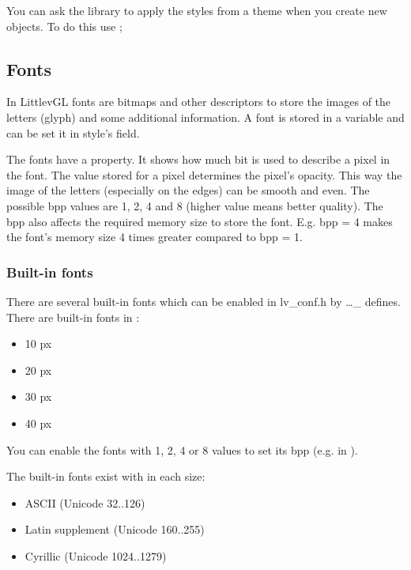 \documentclass[letterpaper,10pt,english]{sphinxmanual}
\begin{document}
You can ask the library to apply the styles from a theme when you create new objects. To do this use ;


\subsection{Fonts}
\label{\detokenize{overview/fonts::doc}}\label{\detokenize{overview/fonts:fonts}}
In LittlevGL fonts are bitmaps and other descriptors to store the images of the letters (glyph) and some additional information. A font is stored in a  variable and can be set it in style’s  field.

The fonts have a  property. It shows how much bit is used to describe a pixel in the font. The value stored for a pixel determines the pixel’s opacity. This way the image of the letters (especially on the edges) can be smooth and even. The possible bpp values are 1, 2, 4 and 8 (higher value means better quality). The bpp also affects the required memory size to store the font. E.g. bpp = 4 makes the font’s memory size 4 times greater compared to bpp = 1.


\subsubsection{Built-in fonts}
\label{\detokenize{overview/fonts:built-in-fonts}}
There are several built-in fonts which can be enabled in lv\_conf.h by …\_ defines. There are built-in fonts in :
\begin{itemize}
\item {} 
10 px

\item {} 
20 px

\item {} 
30 px

\item {} 
40 px

\end{itemize}

You can enable the fonts with 1, 2, 4 or 8 values to set its bpp (e.g.  in ).

The built-in fonts exist with  in each size:
\begin{itemize}
\item {} 
ASCII (Unicode 32..126)

\item {} 
Latin supplement (Unicode 160..255)

\item {} 
Cyrillic (Unicode 1024..1279)

\end{itemize}
\end{document}
